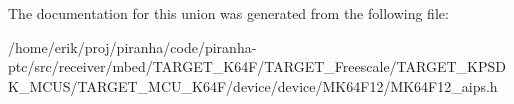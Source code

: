 The documentation for this union was generated from the following file\+:\begin{DoxyCompactItemize}
\item 
/home/erik/proj/piranha/code/piranha-\/ptc/src/receiver/mbed/\+T\+A\+R\+G\+E\+T\+\_\+\+K64\+F/\+T\+A\+R\+G\+E\+T\+\_\+\+Freescale/\+T\+A\+R\+G\+E\+T\+\_\+\+K\+P\+S\+D\+K\+\_\+\+M\+C\+U\+S/\+T\+A\+R\+G\+E\+T\+\_\+\+M\+C\+U\+\_\+\+K64\+F/device/device/\+M\+K64\+F12/M\+K64\+F12\+\_\+aips.\+h\end{DoxyCompactItemize}

